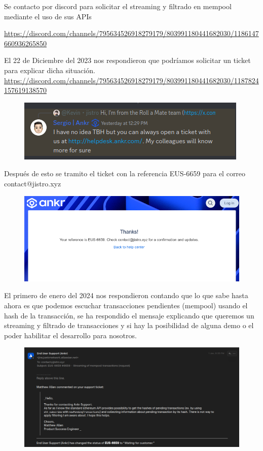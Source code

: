 Se contacto por discord para solicitar el streaming y filtrado en mempool  mediante el uso de sus APIs

\url{https://discord.com/channels/795634526918279179/803991180441682030/1186147660936265850}

El 22 de Diciembre del 2023 nos respondieron que podríamos solicitar un ticket para explicar dicha situación. \url{https://discord.com/channels/795634526918279179/803991180441682030/1187824157619138570}

\begin{figure}
    \centering
    \includegraphics[width=.5\linewidth]{img//screenshots/images32432dsr34.png}
\end{figure}

Después de esto se tramito el ticket con la referencia EUS-6659 para el correo contact@jistro.xyz

\begin{figure}
    \centering
    \includegraphics[width=1\linewidth]{img//screenshots/image4595841654.png}
    
    
\end{figure}
El primero de enero del 2024 nos respondieron contando que lo que sabe hasta ahora es que podemos escuchar transacciones pendientes (mempool) usando el hash de la transacción, se ha respondido el mensaje explicando que queremos un streaming y filtrado de transacciones y si hay la posibilidad de alguna demo o el poder habilitar el desarrollo para nosotros.
\begin{figure}
    \centering
    \includegraphics[width=1\linewidth]{img//screenshots/imageankr23123123.png}
\end{figure}

